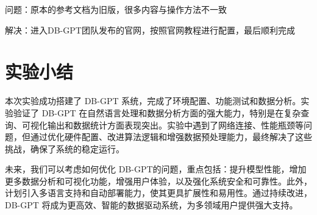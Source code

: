 \documentclass{article}
\begin{document}
	问题：原本的参考文档为旧版，很多内容与操作方法不一致
	
	解决：进入DB-GPT团队发布的官网，按照官网教程进行配置，最后顺利完成
	
	\section{实验小结}
	
	本次实验成功搭建了 DB-GPT 系统，完成了环境配置、功能测试和数据分析。实验验证了 DB-GPT 在自然语言处理和数据分析方面的强大能力，特别是在复杂查询、可视化输出和数据统计方面表现突出。实验中遇到了网络连接、性能瓶颈等问题，但通过优化硬件配置、改进算法逻辑和增强数据预处理能力，最终解决了这些挑战，确保了系统的稳定运行。
	
	未来，我们可以考虑如何优化 DB-GPT的问题，重点包括：提升模型性能，增加更多数据分析和可视化功能，增强用户体验，以及强化系统安全和可靠性。此外，计划引入多语言支持和自动部署能力，使其更具扩展性和易用性。通过持续改进，DB-GPT 将成为更高效、智能的数据驱动系统，为多领域用户提供强大支持。
	
\end{document}
